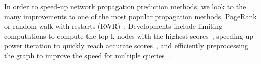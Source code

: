 
In order to speed-up network propagation prediction methods, we look to the many improvements to one of the most popular propagation methods, PageRank or random walk with restarts (RWR)~\cite{page-brin-pagerank-1999}.
Developments include limiting computations to compute the top-k nodes with the highest scores~\cite{zhang-han-ripple-fast-topk-rwr-kdd-2015,fujiwara-onizuka-efficient-pagrank-kdd-2012,fujiwara-onizuka-castanet-pagrank-kdd-2013},
speeding up power iteration to quickly reach accurate scores~\cite{coskun-koyuturk-chopper-kdd-2016},
and efficiently preprocessing the graph to improve the speed for multiple queries~\cite{jung-kang-bepi-billion-scale-rwr-2017}.




